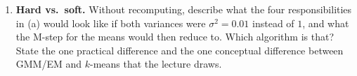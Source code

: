 \documentclass[
  11pt,
]{article}
\providecommand{\tightlist}{%
  \setlength{\itemsep}{0pt}\setlength{\parskip}{0pt}}
\newcommand{\answerspace}[1]{\par\vspace*{#1}}  %
\begin{document}
\answerspace{2.8in}

\begin{enumerate}
\def\labelenumi{(\alph{enumi})}
\setcounter{enumi}{3}
\tightlist
\item
  \textbf{Hard vs.~soft.} Without recomputing, describe what the four
  responsibilities in (a) would look like if both variances were
  \(\sigma^2 = 0.01\) instead of \(1\), and what the M-step for the
  means would then reduce to. Which algorithm is that? State the one
  practical difference and the one conceptual difference between GMM/EM
  and \(k\)-means that the lecture draws.
\end{enumerate}

\answerspace{2.2in}

\begin{solutionbox}


\end{solutionbox}
\end{document}
